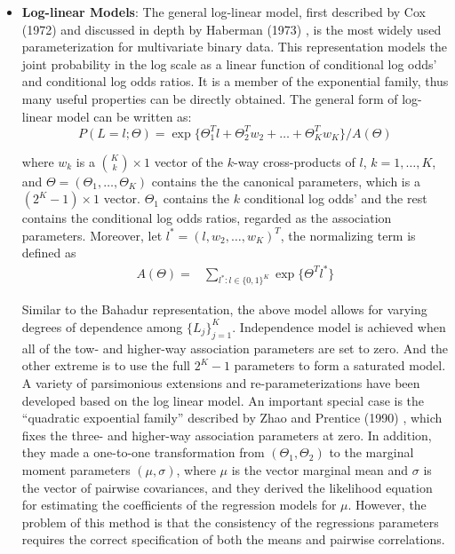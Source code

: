 \documentclass[11 pt, a4paper]{article}  %
\begin{document}
\begin{itemize}
\item {\bf Log-linear Models}: 
The general log-linear model, first described by Cox (1972) \cite{cox1972analysis} and discussed in depth by Haberman (1973) \cite{haberman1973log}, is the most widely used parameterization for multivariate binary data. This representation models the joint probability in the log scale as a linear function of conditional log odds' and conditional log odds ratios. It is a member of the exponential family, thus many useful properties can be directly obtained. The general form of log-linear model can be written as:
\[
P(L=l; \Theta) =  \exp \Big\{\Theta_1^T l + \Theta_2^{T} w_2 + \ldots + \Theta_K^T w_K \Big \} /  A(\Theta)
\]

where $w_k$ is a ${K \choose k} \times 1$ vector of the $k$-way cross-products of $l$, $k = 1,\ldots,K$,  and $\Theta = (\Theta_1,\ldots, \Theta_K)$ contains the the canonical parameters, which is a $(2^K-1) \times 1$ vector. $\Theta_1$ contains the $k$ conditional log odds' and the rest contains the conditional log odds ratios, regarded as the association parameters. Moreover, let $l^* = (l,w_2,\dots,w_K)^T$, the normalizing term is defined as
\begin{align*}
A(\Theta) = & \sum_{l^*:l\in \{0,1\}^K}\exp \{ \Theta^T l^*\} 
\end{align*}

Similar to the Bahadur representation, the above model allows for varying degrees of dependence among $\{ L_j \}_{j=1}^K$. Independence model is achieved when all of the tow- and higher-way association parameters are set to zero. And the other extreme is to use the full $2^K-1$ parameters to form a saturated model. \\

A variety of parsimonious extensions and re-parameterizations have been developed based on the log linear model. An important special case is the ``quadratic expoential family'' described by Zhao and Prentice (1990) \cite{zhao1990correlated}, which fixes the three- and higher-way association parameters at zero. In addition, they made a one-to-one transformation from $(\Theta_1, \Theta_2)$ to the marginal moment parameters $(\mu,\sigma)$, where $\mu$ is the vector marginal mean and $\sigma$ is the vector of pairwise covariances, and they derived the likelihood equation  for estimating the coefficients of the regression models for $\mu$. However, the problem of this method is that the consistency of the regressions parameters requires the correct specification of both the means and pairwise correlations.\\


\end{itemize}
\end{document}
